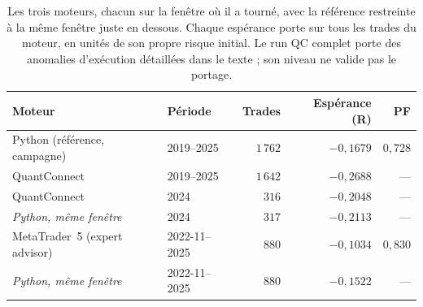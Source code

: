 \begin{table}[htbp]
\centering
\small
\caption{Les trois moteurs, chacun sur la fenêtre où il a tourné, avec la référence restreinte à la même fenêtre juste en dessous. Chaque espérance porte sur tous les trades du moteur, en unités de son propre risque initial. Le run QC complet porte des anomalies d'exécution détaillées dans le texte ; son niveau ne valide pas le portage.}
\label{tab:x10_engines}
\begin{tabular}{l l r r r}
\toprule
\textbf{Moteur} & \textbf{Période} & \textbf{Trades} & \textbf{Espérance (R)} & \textbf{PF} \\
\midrule
Python (référence, campagne) & 2019--2025 & $1\,762$ & $-0{,}1679$ & $0{,}728$ \\
QuantConnect & 2019--2025 & $1\,642$ & $-0{,}2688$ & --- \\
\midrule
QuantConnect & 2024 & $316$ & $-0{,}2048$ & --- \\
\quad\emph{Python, même fenêtre} & 2024 & $317$ & $-0{,}2113$ & --- \\
\midrule
MetaTrader~5 (expert advisor) & 2022-11--2025 & $880$ & $-0{,}1034$ & $0{,}830$ \\
\quad\emph{Python, même fenêtre} & 2022-11--2025 & $880$ & $-0{,}1522$ & --- \\
\bottomrule
\end{tabular}
\end{table}
